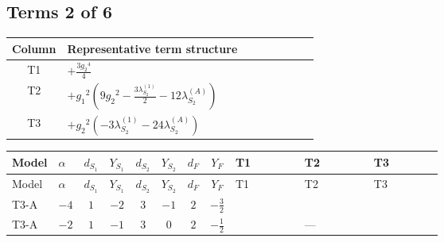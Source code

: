\documentclass[8pt]{article}
\begin{document}
\begin{landscape}
\subsection*{Terms 2 of 6}
\begin{center}
\begin{tabular}{@{}c >{\raggedright\arraybackslash}p{0.82\linewidth}@{}}
\toprule
Column & Representative term structure \\
\midrule
T1 & \(\displaystyle +\frac{3 {g_2}^4}{4}\) \\
\midrule
T2 & \(\displaystyle +{g_1}^2 \left(9 {g_2}^2-\frac{3 {\lambda_{S_2}^{(1)}}}{2}-12 {\lambda_{S_2}^{(A)}}\right)\) \\
\midrule
T3 & \(\displaystyle +{g_2}^2 (-3 {\lambda_{S_2}^{(1)}}-24 {\lambda_{S_2}^{(A)}})\) \\
\midrule
\bottomrule
\end{tabular}
\end{center}
\smallskip
\tiny
\begin{longtable}{@{}llcccccc >{\raggedright\arraybackslash}p{0.21\linewidth} >{\raggedright\arraybackslash}p{0.21\linewidth} >{\raggedright\arraybackslash}p{0.21\linewidth}@{}}
\toprule
Model & $\alpha$ & $d_{S_1}$ & $Y_{S_1}$ & $d_{S_2}$ & $Y_{S_2}$ & $d_F$ & $Y_F$ & T1 & T2 & T3 \\
\midrule
\endfirsthead
\toprule
Model & $\alpha$ & $d_{S_1}$ & $Y_{S_1}$ & $d_{S_2}$ & $Y_{S_2}$ & $d_F$ & $Y_F$ & T1 & T2 & T3 \\
\midrule
\endhead
T3-A & $-4$ & $1$ & $-2$ & $3$ & $-1$ & $2$ & $-\frac{3}{2}$ & \scriptsize\adjustbox{max width=\linewidth}{$\begin{gathered} +\frac{3 {g_2}^4}{4}\end{gathered}$} & \scriptsize\adjustbox{max width=\linewidth}{$\begin{gathered} +{g_1}^2 \left(9 {g_2}^2-\frac{3 {\lambda_{S_2}^{(1)}}}{2}-12 {\lambda_{S_2}^{(A)}}\right)\end{gathered}$} & \scriptsize\adjustbox{max width=\linewidth}{$\begin{gathered} +{g_2}^2 (-3 {\lambda_{S_2}^{(1)}}-24 {\lambda_{S_2}^{(A)}})\end{gathered}$} \\
\midrule
T3-A & $-2$ & $1$ & $-1$ & $3$ & $0$ & $2$ & $-\frac{1}{2}$ & \scriptsize\adjustbox{max width=\linewidth}{$\begin{gathered} +\frac{3 {g_2}^4}{4}\end{gathered}$} & --- & \scriptsize\adjustbox{max width=\linewidth}{$\begin{gathered} +{g_2}^2 (-3 {\lambda_{S_2}^{(1)}}-24 {\lambda_{S_2}^{(A)}})\end{gathered}$} \\

\end{longtable}
\end{landscape}
\end{document}
